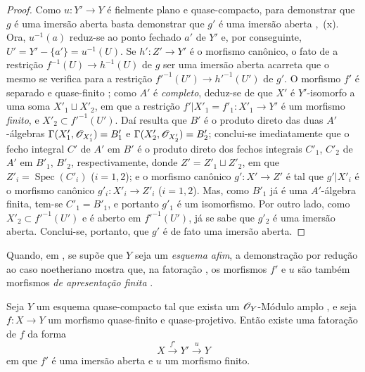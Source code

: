 \begin{proof}
Como $u:Y'\to Y$ é fielmente plano e quase-compacto, para demonstrar que $g$ é uma imersão aberta basta demonstrar que $g'$ é uma imersão aberta ,~(x).
Ora, $u^{-1}(a)$ reduz-se ao ponto fechado $a'$ de $Y'$ e, por conseguinte, $U'=Y'-\{a'\}=u^{-1}(U)$.
Se $h':Z'\to Y'$ é o morfismo canônico, o fato de a restrição $f^{-1}(U)\to h^{-1}(U)$ de $g$ ser uma imersão aberta acarreta que o mesmo se verifica para a restrição $f'^{-1}(U')\to h'^{-1}(U')$ de $g'$.
O morfismo $f'$ é separado e quase-finito ; como $A'$ é \emph{completo}, deduz-se de  que $X'$ é $Y'$-isomorfo a uma soma $X'_1\sqcup X'_2$, em que a restrição $f'|X'_1=f'_1:X'_1\to Y'$ é um morfismo \emph{finito}, e $X'_2\subset f'^{-1}(U')$.
Daí resulta que $B'$ é o produto direto das duas $A'$-álgebras $\Gamma(X'_1,\mathscr{O}_{X'_1})=B'_1$ e $\Gamma(X'_2,\mathscr{O}_{X'_2})=B'_2$; conclui-se imediatamente que o fecho integral $C'$ de $A'$ em $B'$ é o produto direto dos fechos integrais $C'_1$, $C'_2$ de $A'$ em $B'_1$, $B'_2$, respectivamente, donde $Z'=Z'_1\sqcup Z'_2$, em que $Z'_i=\operatorname{Spec}(C'_i)$ ($i=1,2$); e o morfismo canônico $g':X'\to Z'$ é tal que $g'|X'_i$ é o morfismo canônico $g'_i:X'_i\to Z'_i$ ($i=1,2$).
Mas, como $B'_1$ já é uma $A'$-álgebra finita, tem-se $C'_1=B'_1$, e portanto $g'_1$ é um isomorfismo.
Por outro lado, como $X'_2\subset f'^{-1}(U')$ e é aberto em $f'^{-1}(U')$, já
se sabe que $g'_2$ é uma imersão aberta.
Conclui-se, portanto, que $g'$ é de fato uma imersão aberta.
\end{proof}

\begin{remark}[8.12.7]
\label{IV.8.12.7}
Quando, em , se supõe que $Y$ seja um \emph{esquema afim}, a demonstração por redução ao caso noetheriano mostra que, na fatoração , os morfismos $f'$ e $u$ são também morfismos \emph{de apresentação finita} .
\end{remark}

\begin{corollary}[8.12.8]
\label{IV.8.12.8}
Seja $Y$ um esquema quase-compacto tal que exista um $\mathscr{O}_Y$-Módulo amplo , e seja $f:X\to Y$ um morfismo quase-finito e quase-projetivo.
Então existe uma fatoração de $f$ da forma
\[
X\xrightarrow{f'}Y'\xrightarrow{u}Y
\]
em que $f'$ é uma imersão aberta e $u$ um morfismo finito.
\end{corollary}


